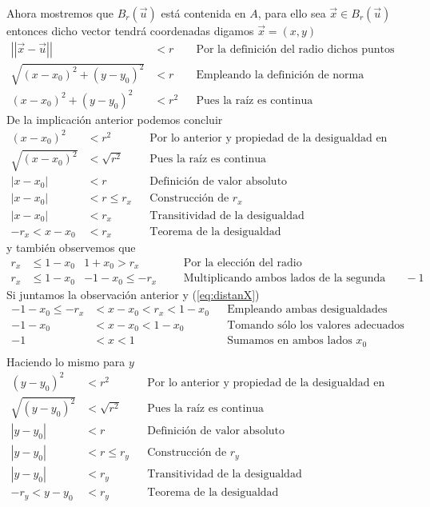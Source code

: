 \documentclass[letterpaper]{article}
\providecommand{\abs}[1]{\left|#1\right|}
\providecommand{\norm}[1]{\left|\left|#1\right|\right|}
\renewcommand{\*}{\cdot}
\theoremstyle{definition}
\begin{document}
Ahora mostremos que $ B_r(\vec{u})  $ está contenida en $ A $, para ello sea $ \vec{x} \in B_r(\vec{u}) $ entonces dicho vector tendrá coordenadas digamos $ \vec{x} = (x, y) $
\begin{align*}
	\norm{\vec{x} - \vec{u} } &< r &&\text{Por la definición del radio dichos puntos distan menos que r} \\
	\sqrt{(x - x_0)^2 + (y - y_0)^2} &< r &&\text{Empleando la definición de norma}\\
	(x - x_0)^2 + (y - y_0)^2 &< r^2 &&\text{Pues la raíz es continua}
\end{align*}
De la implicación anterior podemos concluir 
\begin{align*}
	(x - x_0)^2 &< r^2 && \text{Por lo anterior y propiedad de la desigualdad en sumas}\\
	\sqrt{(x - x_0)^2} &< \sqrt{r^2} && \text{Pues la raíz es continua}\\
	\abs{x - x_0} &< r && \text{Definición de valor absoluto}\\
	\abs{x - x_0} &< r \leq r_x && \text{Construcción de }r_x\\
	\abs{x - x_0} &< r_x && \text{Transitividad de la desigualdad }\\
	-r_x < x - x_0 &< r_x && \text{Teorema de la desigualdad } \label{eq:distanX}\tag{\Denarius}
\end{align*}
y también observemos que
\begin{align*}
	r_x &\leq 1 - x_0  &1 + x_0 > r_x &&&\text{Por la elección del radio}\\
	r_x &\leq 1 - x_0  &-1 - x_0 \leq -r_x &&&\text{Multiplicando ambos lados de la segunda desigualdad por }-1
\end{align*}
Si juntamos la observación anterior y (\ref{eq:distanX})
\begin{align*}
	-1 - x_0 \leq -r_x &< x - x_0 < r_x < 1 - x_0 &&\text{Empleando ambas desigualdades}\\
	-1 - x_0 &< x - x_0 < 1 - x_0 &&\text{Tomando sólo los valores adecuados}\\
	-1 &< x < 1 &&\text{Sumamos en ambos lados  } x_0\\
\end{align*}
Haciendo lo mismo para $ y $
\begin{align*}
	(y - y_0)^2 &< r^2 && \text{Por lo anterior y propiedad de la desigualdad en sumas}\\
	\sqrt{(y - y_0)^2} &< \sqrt{r^2} && \text{Pues la raíz es continua}\\
	\abs{y - y_0} &< r && \text{Definición de valor absoluto}\\
	\abs{y - y_0} &< r \leq r_y && \text{Construcción de }r_y\\
	\abs{y - y_0} &< r_y && \text{Transitividad de la desigualdad }\\
	-r_y < y - y_0 &< r_y && \text{Teorema de la desigualdad } \label{eq:distanY}\tag{\Florin}
\end{align*}
\end{document}
